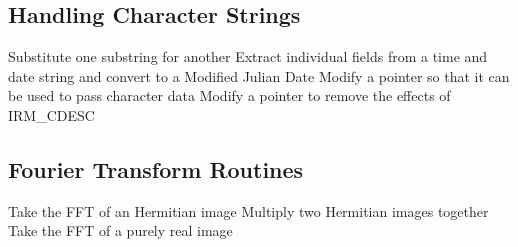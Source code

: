 \subsection {Handling Character Strings}
  {Substitute one substring for another}
  {Extract individual fields from a time and date string and convert
   to a Modified Julian Date}
  {Modify a pointer so that it can be used to pass character data}
  {Modify a pointer to remove the effects of IRM\_CDESC}


\subsection {Fourier Transform Routines}
  {Take the FFT of an Hermitian image}
  {Multiply two Hermitian images together}
  {Take the FFT of a purely real image}

